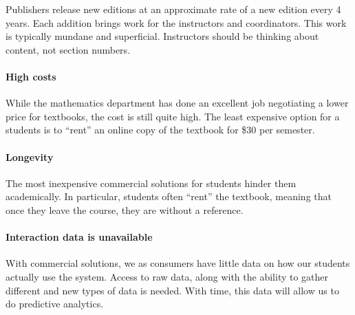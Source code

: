 \documentclass{ximera}
\begin{document}
Publishers release new editions at an approximate rate of a new
edition every 4 years. Each addition brings work for the instructors
and coordinators. This work is typically mundane and
superficial. Instructors should be thinking about content, not section
numbers.




\paragraph{High costs}
While the mathematics department has done an excellent job negotiating
a lower price for textbooks, the cost is still quite high.  The least
expensive option for a students is to ``rent'' an online copy of the
textbook for \$30 per semester. 


\paragraph{Longevity}
The most inexpensive commercial solutions for students hinder them
academically. In particular, students often ``rent'' the textbook,
meaning that once they leave the course, they are without a reference.



\paragraph{Interaction data is unavailable}

With commercial solutions, we as consumers have little data on how our
students actually use the system. Access to raw data, along with the
ability to gather different and new types of data is needed. With
time, this data will allow us to do predictive analytics.

\end{document}
